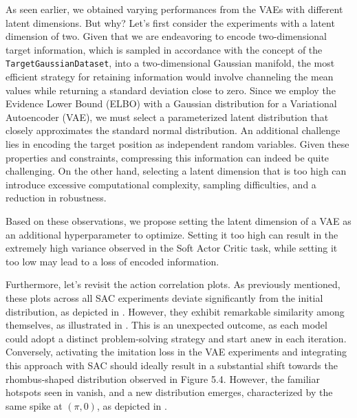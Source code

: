 As seen earlier, we obtained varying performances from the VAEs with different latent dimensions. But why? Let's first consider the experiments with a latent dimension of two. Given that we are endeavoring to encode two-dimensional target information, which is sampled in accordance with the concept of the \texttt{TargetGaussianDataset}, into a two-dimensional Gaussian manifold, the most efficient strategy for retaining information would involve channeling the mean values while returning a standard deviation close to zero. Since we employ the Evidence Lower Bound (ELBO) with a Gaussian distribution for a Variational Autoencoder (VAE), we must select a parameterized latent distribution that closely approximates the standard normal distribution. An additional challenge lies in encoding the target position as independent random variables. Given these properties and constraints, compressing this information can indeed be quite challenging. On the other hand, selecting a latent dimension that is too high can introduce excessive computational complexity, sampling difficulties, and a reduction in robustness.

Based on these observations, we propose setting the latent dimension of a VAE as an additional hyperparameter to optimize. Setting it too high can result in the extremely high variance observed in the Soft Actor Critic task, while setting it too low may lead to a loss of encoded information.

Furthermore, let's revisit the action correlation plots. As previously mentioned, these plots across all SAC experiments deviate significantly from the initial distribution, as depicted in . However, they exhibit remarkable similarity among themselves, as illustrated in . This is an unexpected outcome, as each model could adopt a distinct problem-solving strategy and start anew in each iteration. Conversely, activating the imitation loss in the VAE experiments and integrating this approach with SAC should ideally result in a substantial shift towards the rhombus-shaped distribution observed in Figure 5.4. However, the familiar hotspots seen in  vanish, and a new distribution emerges, characterized by the same spike at $(\pi, 0)$, as depicted in .


